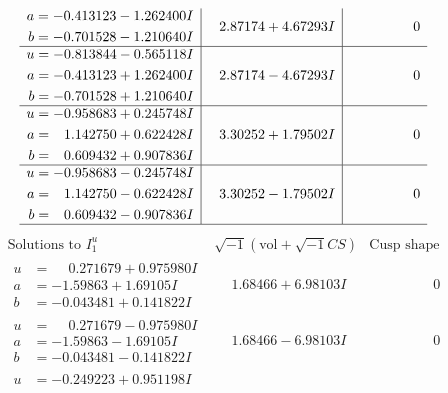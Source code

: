 \documentclass[1p]{elsarticle_modified}
\theoremstyle{definition}
\newcommand{\I}{\sqrt{-1}}
\begin{document}
$$\begin{array}{c|c|c}
\begin{aligned}
a &= -0.413123 - 1.262400 I \\
b &= -0.701528 - 1.210640 I\end{aligned}
 & \phantom{-}2.87174 + 4.67293 I & \phantom{-0.000000 } 0 \\ \hline\begin{aligned}
u &= -0.813844 - 0.565118 I \\
a &= -0.413123 + 1.262400 I \\
b &= -0.701528 + 1.210640 I\end{aligned}
 & \phantom{-}2.87174 - 4.67293 I & \phantom{-0.000000 } 0 \\ \hline\begin{aligned}
u &= -0.958683 + 0.245748 I \\
a &= \phantom{-}1.142750 + 0.622428 I \\
b &= \phantom{-}0.609432 + 0.907836 I\end{aligned}
 & \phantom{-}3.30252 + 1.79502 I & \phantom{-0.000000 } 0 \\ \hline\begin{aligned}
u &= -0.958683 - 0.245748 I \\
a &= \phantom{-}1.142750 - 0.622428 I \\
b &= \phantom{-}0.609432 - 0.907836 I\end{aligned}
 & \phantom{-}3.30252 - 1.79502 I & \phantom{-0.000000 } 0\\
 \hline 
 \end{array}$$\newpage$$\begin{array}{c|c|c}  
\text{Solutions to }I^u_{1}& \I (\text{vol} + \sqrt{-1}CS) & \text{Cusp shape}\\
 \hline 
\begin{aligned}
u &= \phantom{-}0.271679 + 0.975980 I \\
a &= -1.59863 + 1.69105 I \\
b &= -0.043481 + 0.141822 I\end{aligned}
 & \phantom{-}1.68466 + 6.98103 I & \phantom{-0.000000 } 0 \\ \hline\begin{aligned}
u &= \phantom{-}0.271679 - 0.975980 I \\
a &= -1.59863 - 1.69105 I \\
b &= -0.043481 - 0.141822 I\end{aligned}
 & \phantom{-}1.68466 - 6.98103 I & \phantom{-0.000000 } 0 \\ \hline\begin{aligned}
u &= -0.249223 + 0.951198 I \\

\end{aligned}
\end{array}$$
\end{document}

